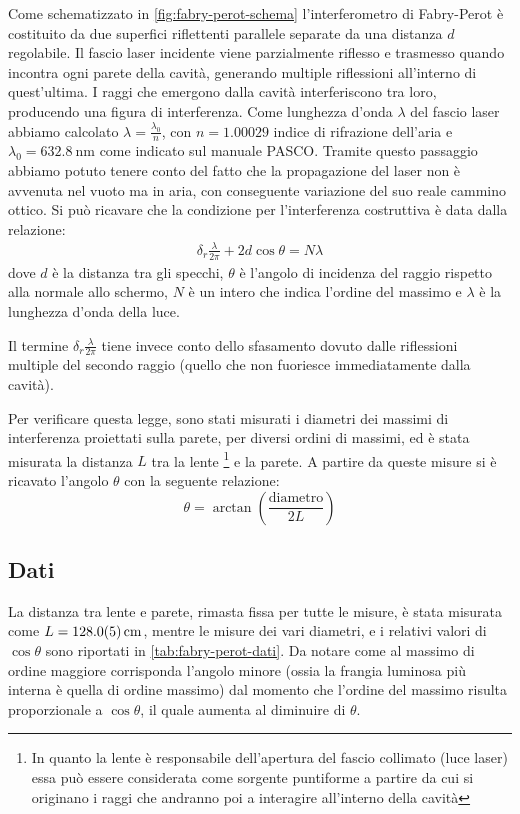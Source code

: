 \documentclass[a4paper]{article}
\begin{document}
Come schematizzato in \cref{fig:fabry-perot-schema} l'interferometro di Fabry-Perot è costituito da due superfici riflettenti parallele separate da una distanza $d$ regolabile. Il fascio laser incidente viene parzialmente riflesso e trasmesso quando incontra ogni parete della cavità, generando multiple riflessioni all'interno di quest'ultima. I raggi che emergono dalla cavità interferiscono tra loro, producendo una figura di interferenza.
Come lunghezza d'onda $\lambda$ del fascio laser abbiamo calcolato $\lambda = \frac{\lambda_0}{n}$, con $n=\num{1.00029}$ indice di rifrazione dell'aria e $\lambda_0 = \SI{632.8}{\nano\meter}$ come indicato sul manuale PASCO. Tramite questo passaggio abbiamo potuto tenere conto del fatto che la propagazione del laser non è avvenuta nel vuoto ma in aria, con conseguente variazione del suo reale cammino ottico.
Si può ricavare che la condizione per l'interferenza costruttiva è data dalla relazione:
\begin{align}
   \delta_r\frac{\lambda}{2\pi}+ 2d \cos \theta = N\lambda
\label{eq:max-interferenza-fabry-perot}
\end{align}
dove $d$ è la distanza tra gli specchi, $\theta$ è l'angolo di incidenza del raggio rispetto alla normale allo schermo, $N$ è un intero che indica l'ordine del massimo e $\lambda$ è la lunghezza d'onda della luce.

Il termine $\delta_r\frac{\lambda}{2\pi}$ tiene invece conto dello sfasamento dovuto dalle riflessioni multiple del secondo raggio (quello che non fuoriesce immediatamente dalla cavità).

Per verificare questa legge, sono stati misurati i diametri dei massimi di interferenza proiettati sulla parete, per diversi ordini di massimi, ed è stata misurata la distanza $L$ tra la lente \footnote{In quanto la lente è responsabile dell'apertura del fascio collimato (luce laser) essa può essere considerata come sorgente puntiforme a partire da cui si originano i raggi che andranno poi a interagire all'interno della cavità} e la parete. A partire da queste misure si è ricavato l'angolo $\theta$ con la seguente relazione:
\[\theta = \arctan \left(\frac{\text{diametro}}{2L}\right)\]

\subsection{Dati}
La distanza tra lente e parete, rimasta fissa per tutte le misure, è stata misurata come $L=\SI{128 \pm 0.5}{\centi\meter}$, mentre le misure dei vari diametri, e i relativi valori di $\cos{\theta}$ sono riportati in \cref{tab:fabry-perot-dati}. Da notare come al massimo di ordine maggiore corrisponda l'angolo minore (ossia la frangia luminosa più interna è quella di ordine massimo) dal momento che l'ordine del massimo risulta proporzionale a $\cos{\theta}$, il quale aumenta al diminuire di $\theta$.
\end{document}
